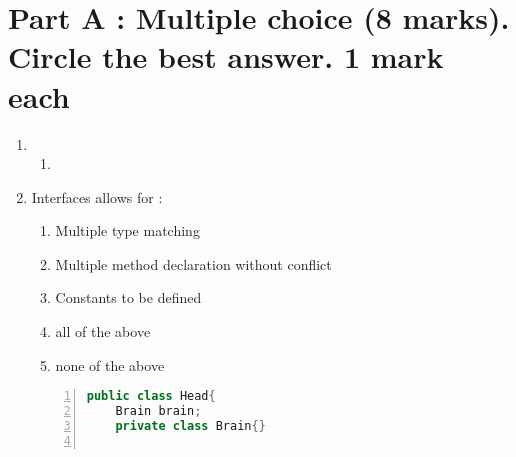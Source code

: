 \documentclass{article}
\author{}
\date{}
\title{}
\begin{document}
\maketitle
\newpage
\tableofcontents
\newpage

\section{Part A : Multiple choice (8 marks). Circle the best answer. 1 mark each}
\begin{enumerate}
	\item
	\begin{enumerate}
		\item 
	\end{enumerate}
	\item Interfaces allows for :
	\begin{enumerate}
		\item Multiple type matching
		\item Multiple method declaration without conflict
		\item Constants to be defined
		\item all of the above
		\item none of the above
	\end{enumerate}
	\begin{lstlisting}[language=Java, numbers=left]
public class Head{
	Brain brain;
	private class Brain{}
			

\end{lstlisting}
\end{enumerate}
\end{document}
